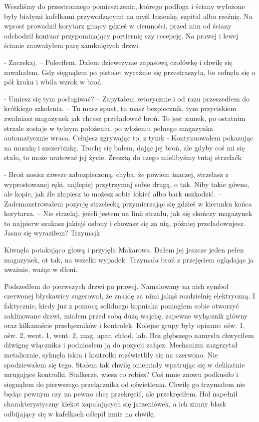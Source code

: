 \documentclass[../MAIN.tex]{subfiles}
\begin{document}
Weszliśmy do przestronnego pomieszczenia, którego podłoga i ściany wyłożone były białymi kafelkami przywodzącymi na myśl łazienkę, szpital albo rzeźnię. Na wprost prowadził korytarz ginący gdzieś w ciemności, przed nim od ściany odchodził kontuar przypominający portiernię czy recepcję. Na prawej i lewej ścianie zauważyłem parę zamkniętych drzwi.

- Zaczekaj. – Poleciłem. Dałem dziewczynie zapasową czołówkę i chwilę się zawahałem. Gdy sięgnąłem po pistolet wyraźnie się przestraszyła, bo cofnęła się o pół kroku i wbiła wzrok w broń.

- Umiesz się tym posługiwać? – Zapytałem retorycznie i od razu przeszedłem do krótkiego szkolenia. – Tu masz spust, tu masz bezpiecznik, tym przyciskiem zwalniasz magazynek jak chcesz przeładować broń. To jest zamek, po ostatnim strzale zostaje w tylnym położeniu, po włożeniu pełnego magazynka automatycznie wraca. Celujesz zgrywając to, z tym\3k - Kontynuowałem pokazując na muszkę i szczerbinkę. Trochę się bałem, dając jej broń, ale gdyby coś mi się stało, to może uratować jej życie. Zresztą do czego mielibyśmy tutaj strzelać\3k

- Broń nosisz zawsze zabezpieczoną, chyba, że powiem inaczej, strzelasz z wyprostowanej ręki, najlepiej przytrzymaj sobie drugą, o tak. Niby takie gówno, ale kopie, jak źle złapiesz to możesz sobie łokieć albo bark uszkodzić. – Zademonstrowałem pozycję strzelecką przymierzając się gdzieś w kierunku końca korytarza. – Nie strzelaj, jeżeli jestem na linii strzału, jak się skończy magazynek to najpierw szukasz jakiejś osłony i chowasz się za nią, później przeładowujesz. Jasno się wyraziłem? Trzymaj\3k

Kiwnęła potakująco głową i przyjęła Makarowa. Dałem jej jeszcze jeden pełen magazynek, ot tak, na wszelki wypadek. Trzymała broń z przejęciem oglądając ja uważnie, ważąc w dłoni.

Podszedłem do pierwszych drzwi po prawej. Namalowany na nich symbol czerwonej błyskawicy sugerował, że znajdę za nimi jakąś rozdzielnię elektryczną. I faktycznie, kiedy już z pomocą solidnego kopniaka pomogłem sobie otworzyć zaklinowane drzwi, miałem przed sobą dużą wajchę, zapewne wyłącznik główny oraz kilkanaście przełączników i kontrolek. Kolejne grupy były opisane: ośw. 1, ośw. 2, went. 1, went. 2, mag, apar, chłod, lab. Bez głębszego namysłu chwyciłem dźwignę włącznika i podniosłem ją do pozycji załącz. Mechanizm zazgrzytał metalicznie, syknęła iskra i kontrolki rozświetliły się na czerwono. Nie spodziewałem się tego. Stałem tak chwilę oniemiały wpatrując się w delikatnie mrugające kontrolki. Stalkerze, wiesz co robisz? Coś mnie znowu podkusiło i sięgnąłem do pierwszego przełącznika od oświetlenia. Chwilę go trzymałem nie będąc pewnym czy na pewno chcę przekręcić, ale przekręciłem. Hol napełnił charakterystyczny klekot zapalających się jarzeniówek, a ich zimny blask odbijający się w kafelkach oślepił 
mnie na chwilę.
\end{document}
